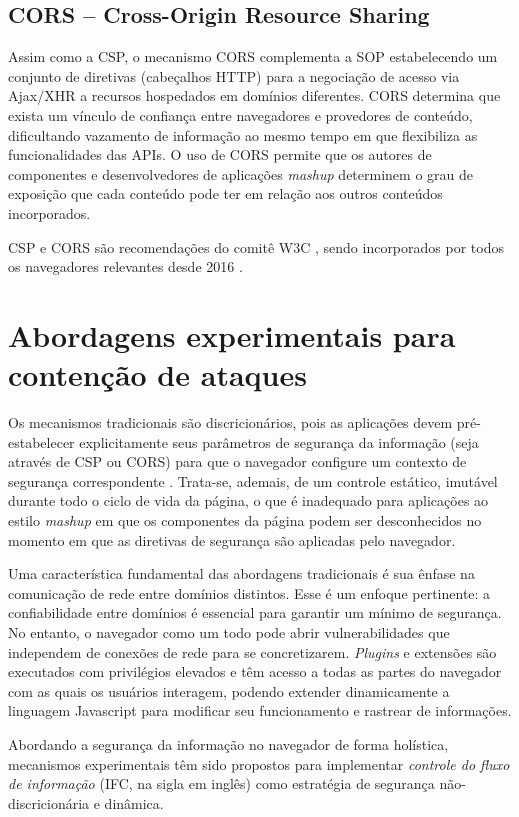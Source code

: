 \subsection{CORS -- Cross-Origin Resource Sharing}
Assim como a CSP, o mecanismo CORS \cite{W3C:CORS} complementa a SOP estabelecendo um conjunto de diretivas (cabeçalhos HTTP) para a negociação de acesso via Ajax/XHR a recursos hospedados em domínios diferentes. CORS determina que exista um vínculo de confiança entre navegadores e provedores de conteúdo, dificultando vazamento de informação ao mesmo tempo em que flexibiliza as funcionalidades das APIs. O uso de CORS permite que os autores de componentes e desenvolvedores de aplicações \textit{mashup} determinem o grau de exposição que cada conteúdo pode ter em relação aos outros conteúdos incorporados.

CSP e CORS são recomendações do comitê W3C \cite{W3C:CSP} \cite{W3C:CORS}, sendo incorporados por todos os navegadores relevantes desde 2016 \cite{CanIUse:CSP} \cite{CanIUse:CORS}.


\section{Abordagens experimentais para contenção de ataques}
Os mecanismos tradicionais são discricionários, pois as aplicações devem pré-estabelecer explicitamente seus parâmetros de segurança da informação (seja através de CSP ou CORS) para que o navegador configure um contexto de segurança correspondente \cite[p. 33]{stefan:2015:phdthesis}. Trata-se, ademais, de um controle estático, imutável durante todo o ciclo de vida da página, o que é inadequado para aplicações ao estilo \textit{mashup} em que os componentes da página podem ser desconhecidos no momento em que as diretivas de segurança são aplicadas pelo navegador.

Uma característica fundamental das abordagens tradicionais é sua ênfase na comunicação de rede entre domínios distintos. Esse é um enfoque pertinente: a confiabilidade entre domínios é essencial para garantir um mínimo de segurança. No entanto, o navegador como um todo pode abrir vulnerabilidades que independem de conexões de rede para se concretizarem. \textit{Plugins} e extensões são executados com privilégios elevados e têm acesso a todas as partes do navegador com as quais os usuários interagem, podendo extender dinamicamente a linguagem Javascript para modificar seu funcionamento e rastrear de informações.

Abordando a segurança da informação no navegador de forma holística, mecanismos experimentais têm sido propostos para implementar \textit{controle do fluxo de informação} (IFC, na sigla em inglês) como estratégia de segurança não-discricionária e dinâmica.


